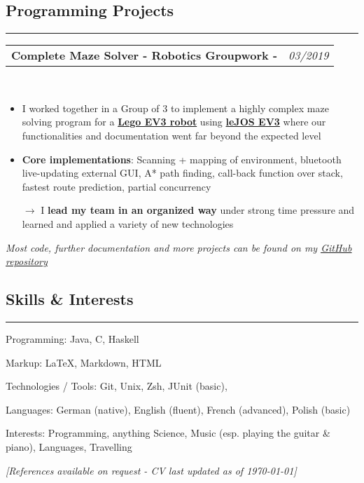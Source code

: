 \documentclass[10pt,letterpaper]{article}
\makeatletter
\newcommand{\headerrow}[2]
{\begin{tabular*}{\linewidth}{l@{\extracolsep{\fill}}r}
	#1 &
	#2 \\
\end{tabular*}}
\makeatother
\begin{document}
\subsection*{\Large{Programming Projects}}
\hrule
\vspace{0.4em}
\noindent
\headerrow{\textbf{Complete Maze Solver - Robotics Groupwork - \fbox{20/20}}}{\emph{03/2019}}
\\
\vspace{-1.6em}
\begin{itemize}
	\item I worked together in a Group of 3 to implement a highly complex maze solving program for a \href{https://education.lego.com/en-gb/product/mindstorms-ev3}{\textbf{Lego EV3 robot}} using \href{http://www.lejos.org/}{\textbf{leJOS EV3}} where our functionalities and documentation went far beyond the expected level
	\item \textbf{Core implementations}: Scanning + mapping of environment, bluetooth live-updating external GUI, A* path finding, 
	call-back function over stack, fastest route prediction, partial concurrency
	\item[$\rightarrow$] I \textbf{lead my team in an organized way} under strong time pressure and learned and applied a variety of new technologies
\end{itemize}
\emph{Most code, further documentation and more projects can be found on my \href{https://github.com/j0ner0n}{\underline{GitHub repository}}}

\subsection*{\Large{Skills \& Interests}}
\hrule
\vspace{0.4em}
\begin{description*}
	\item[Programming:]
	Java, C, Haskell
    	\item[Markup:]
    	\LaTeX, Markdown, HTML
	\item[Technologies / Tools:]
	Git, Unix, Zsh, JUnit (basic), 
	\item[Languages:]
	German (native), English (fluent), French (advanced), Polish (basic)
   	\item[Interests:]
	Programming, anything Science, Music (esp. playing the guitar \& piano), Languages, Travelling
\end{description*}



\hfill \small \textit{[References available on request - CV last updated as of {\today}]}
\end{document}
